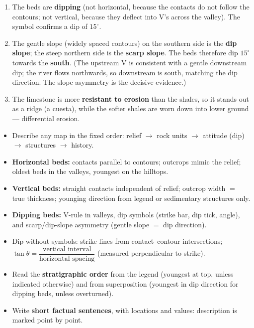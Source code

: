 \documentclass[11pt]{article}
\newcommand{\cle}[1]{{\popxbold\color{popdark}#1}}
\begin{document}
\begin{corrige}[Exercise 1]
\begin{enumerate}
\item The beds are \textbf{dipping} (not horizontal, because the contacts do not follow the contours; not vertical, because they deflect into V's across the valley). The symbol confirms a dip of $15^\circ$.
\item The gentle slope (widely spaced contours) on the southern side is the \textbf{dip slope}; the steep northern side is the \textbf{scarp slope}. The beds therefore dip $15^\circ$ towards the \textbf{south}. (The upstream V is consistent with a gentle downstream dip; the river flows northwards, so downstream is south, matching the dip direction. The slope asymmetry is the decisive evidence.)
\item The limestone is more \textbf{resistant to erosion} than the shales, so it stands out as a ridge (a cuesta), while the softer shales are worn down into lower ground — differential erosion.
\end{enumerate}
\end{corrige}

\begin{aretenir}
\begin{itemize}
\item Describe any map in the fixed order: \cle{relief} $\rightarrow$ \cle{rock units} $\rightarrow$ \cle{attitude (dip)} $\rightarrow$ \cle{structures} $\rightarrow$ \cle{history}.
\item \textbf{Horizontal beds:} contacts parallel to contours; outcrops mimic the relief; oldest beds in the valleys, youngest on the hilltops.
\item \textbf{Vertical beds:} straight contacts independent of relief; outcrop width $=$ true thickness; younging direction from legend or sedimentary structures only.
\item \textbf{Dipping beds:} V-rule in valleys, dip symbols (strike bar, dip tick, angle), and scarp/dip-slope asymmetry (gentle slope $=$ dip direction).
\item Dip without symbols: strike lines from contact--contour intersections; $\tan\theta = \dfrac{\text{vertical interval}}{\text{horizontal spacing}}$ (measured perpendicular to strike).
\item Read the \textbf{stratigraphic order} from the legend (youngest at top, unless indicated otherwise) and from superposition (youngest in dip direction for dipping beds, unless overturned).
\item Write \textbf{short factual sentences}, with locations and values: description is marked point by point.
\end{itemize}
\end{aretenir}
\end{document}
